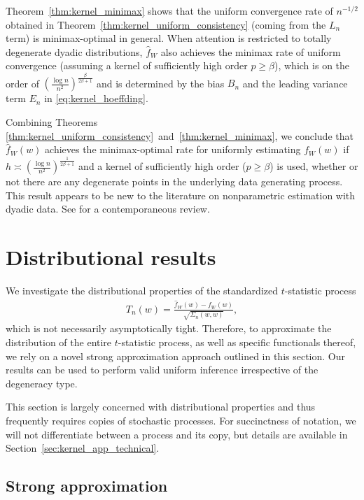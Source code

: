 \documentclass[11pt,lof]{puthesis}
\theoremstyle{break}
\theoremstyle{proof}
\begin{document}
Theorem~\ref{thm:kernel_minimax} shows that the uniform convergence rate of
$n^{-1/2}$ obtained in Theorem~\ref{thm:kernel_uniform_consistency}
(coming from the $L_n$ term) is minimax-optimal in general.
When attention is restricted to totally degenerate dyadic distributions,
$\hat f_W$ also achieves the minimax rate of uniform convergence
(assuming a kernel of sufficiently high order $p \geq \beta$),
which is on the order of
$\left(\frac{\log n}{n^2}\right)^{\frac{\beta}{2\beta+1}}$ and
is determined by the bias $B_n$ and the leading variance term $E_n$ in
\eqref{eq:kernel_hoeffding}.

Combining Theorems
\ref{thm:kernel_uniform_consistency}~and~\ref{thm:kernel_minimax},
we conclude that $\hat{f}_W(w)$ achieves the minimax-optimal rate for uniformly
estimating $f_W(w)$ if $h \asymp \left( \frac{\log n}{n^2}
\right)^{\frac{1}{2\beta+1}}$ and a kernel of sufficiently high order
($p \geq \beta$) is used, whether or not there are any degenerate points in the
underlying data generating process. This result appears to be new to the
literature on nonparametric estimation with dyadic data. See
\citet{gao2021minimax} for a contemporaneous review.

\section{Distributional results}
\label{sec:kernel_inference}

We investigate the distributional properties of the
standardized $t$-statistic process
%
\begin{align*}
  T_n(w) = \frac{\hat{f}_W(w) - f_W(w)}{\sqrt{\Sigma_n(w,w)}},
\end{align*}
%
which is not necessarily asymptotically tight. Therefore, to approximate the
distribution of the entire $t$-statistic process, as well as specific
functionals thereof, we rely on a novel strong approximation approach outlined
in this section. Our results can be used to perform valid uniform inference
irrespective of the degeneracy type.

This section is largely concerned with distributional properties and thus
frequently requires copies of stochastic processes. For succinctness of
notation, we will not differentiate between a process and its copy, but details
are available in Section~\ref{sec:kernel_app_technical}.

\subsection{Strong approximation}
\end{document}
